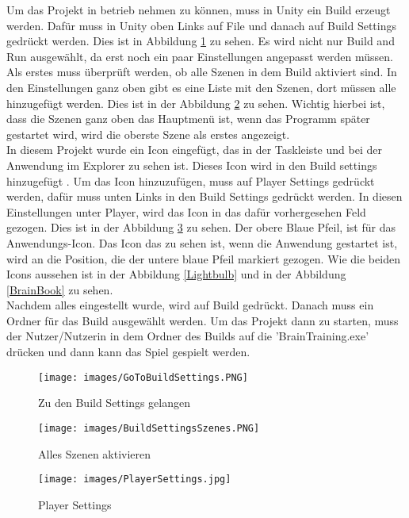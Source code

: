 Um das Projekt in betrieb nehmen zu können, muss in Unity ein Build erzeugt werden. Dafür muss in Unity oben Links auf File und danach auf Build Settings gedrückt werden. Dies ist in Abbildung \ref{GoToBuildSettings} zu sehen. Es wird nicht nur Build and Run ausgewählt, da erst noch ein paar Einstellungen angepasst werden müssen.\\
Als erstes muss überprüft werden, ob alle Szenen in dem Build aktiviert sind. In den Einstellungen ganz oben gibt es eine Liste mit den Szenen, dort müssen alle hinzugefügt werden. Dies ist in der Abbildung \ref{BuildSettingsSzene} zu sehen. Wichtig hierbei ist, dass die Szenen ganz oben das Hauptmenü ist, wenn das Programm später gestartet wird, wird die oberste Szene als erstes angezeigt.\\
In diesem Projekt wurde ein Icon eingefügt, das in der Taskleiste und bei der Anwendung im Explorer zu sehen ist. Dieses Icon wird in den Build settings hinzugefügt \autocite{Glühbirne}. Um das Icon hinzuzufügen, muss auf Player Settings gedrückt werden, dafür muss unten Links in den Build Settings gedrückt werden. In diesen Einstellungen unter Player, wird das Icon in das dafür vorhergesehen Feld gezogen. Dies ist in der Abbildung \ref{PlayerSettings} zu sehen. Der obere Blaue Pfeil, ist für das Anwendungs-Icon. Das Icon das zu sehen ist, wenn die Anwendung gestartet ist, wird an die Position, die der untere blaue Pfeil\autocite{Gehirn} markiert gezogen. Wie die beiden Icons aussehen ist in der Abbildung \ref{Lightbulb} und in der Abbildung \ref{BrainBook} zu sehen.\\
Nachdem alles eingestellt wurde, wird auf Build gedrückt. Danach muss ein Ordner für das Build ausgewählt werden. Um das Projekt dann zu starten, muss der Nutzer/Nutzerin in dem Ordner des Builds auf die 'BrainTraining.exe' drücken und dann kann das Spiel gespielt werden.
\begin{figure}[htbp]
  \centering
  \texttt{[image: images/GoToBuildSettings.PNG]}
  \caption{Zu den Build Settings gelangen}
  \label{GoToBuildSettings}
\end{figure}
\begin{figure}[htbp]
  \centering
  \texttt{[image: images/BuildSettingsSzenes.PNG]}
  \caption{Alles Szenen aktivieren}
  \label{BuildSettingsSzene}
\end{figure}
\begin{figure}[htbp]
  \centering
  \texttt{[image: images/PlayerSettings.jpg]}
  \caption{Player Settings}
  \label{PlayerSettings}
\end{figure}

